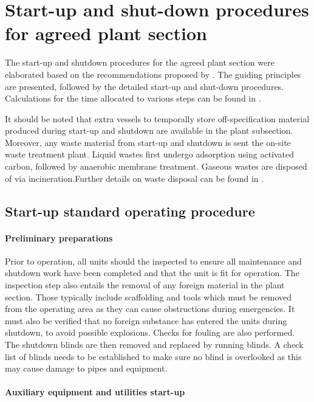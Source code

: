 \section{Start-up and shut-down procedures for agreed plant section}
The start-up and shutdown procedures for the agreed plant section were elaborated based on the recommendations proposed by \textcite{}. The guiding principles are presented, followed by the detailed start-up and shut-down procedures. Calculations for the time allocated to various steps can be found in .

It should be noted that extra vessels to temporally store off-specification material produced during start-up and shutdown are available in the plant subsection. Moreover, any waste material from start-up and shutdown is sent the on-site waste treatment plant. Liquid wastes first undergo adsorption using activated carbon, followed by anaerobic membrane treatment. Gaseous wastes are disposed of via incineration.Further details on waste disposal can be found in .

\subsection{Start-up standard operating procedure}

\paragraph{Preliminary preparations}
Prior to operation, all units should the inspected to ensure all maintenance and shutdown work have been completed and that the unit is fit for operation. The inspection step also entails the removal of any foreign material in the plant section. Those typically include scaffolding and tools which must be removed from the operating area as they can cause obstructions during emergencies. It must also be verified that no foreign substance has entered the units during shutdown, to avoid possible explosions. Checks for fouling are also performed. The shutdown blinds are then removed and replaced by running blinds. A check list of blinds needs to be established to make sure no blind is overlooked as this may cause damage to pipes and equipment.



\paragraph{Auxiliary equipment and utilities start-up}


